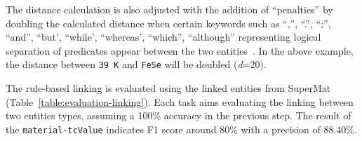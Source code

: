 \documentclass[]{interact}
\theoremstyle{plain}%
\theoremstyle{definition}
\theoremstyle{remark}
\newcommand{\tc}{T$_{c}$}
\begin{document}
The distance calculation is also adjusted with the addition of ``penalties'' by doubling the calculated distance when certain keywords such as ``,'', ``.'', ``;'', ``and'', ``but', ``while', ``whereas', ``which'', ``although'' representing logical separation of predicates appear between the two entities~\cite{oka2021table}.
In the above example, the distance between \texttt{39 K} and \texttt{FeSe} will be doubled (\textit{d}=20).

The rule-based linking is evaluated using the linked entities from SuperMat~\cite{foppiano2021supermat} (Table~\ref{table:evaluation-linking}).
Each task aims evaluating the linking between two entities types, assuming a 100\% accuracy in the previous step.
The result of the \texttt{material-tcValue} indicates F1 score around 80\% with a precision of 88.40\%.

\begin{table}[ht]
    \centering
    \label{table:evaluation-linking}
\end{table}

\end{document}
